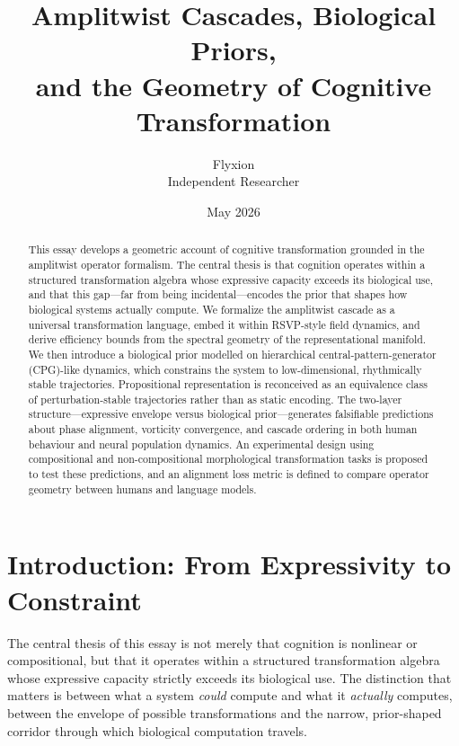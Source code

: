 \documentclass[12pt, a4paper]{article}
\title{\textbf{Amplitwist Cascades, Biological Priors,\\[0.3ex]
and the Geometry of Cognitive Transformation}}
\author{Flyxion\\[0.5ex]
\small Independent Researcher}
\date{May 2026}
\theoremstyle{remark}
\theoremstyle{definition}
\begin{document}
\maketitle

\begin{abstract}
\noindent
This essay develops a geometric account of cognitive transformation grounded in the
amplitwist operator formalism.  The central thesis is that cognition operates within a
structured transformation algebra whose expressive capacity exceeds its biological use,
and that this gap---far from being incidental---encodes the prior that shapes how biological
systems actually compute.  We formalize the amplitwist cascade as a universal transformation
language, embed it within RSVP-style field dynamics, and derive efficiency bounds from the
spectral geometry of the representational manifold.  We then introduce a biological prior
modelled on hierarchical central-pattern-generator (CPG)-like dynamics, which constrains
the system to low-dimensional, rhythmically stable trajectories.  Propositional
representation is reconceived as an equivalence class of perturbation-stable trajectories
rather than as static encoding.  The two-layer structure---expressive envelope versus
biological prior---generates falsifiable predictions about phase alignment, vorticity
convergence, and cascade ordering in both human behaviour and neural population dynamics.
An experimental design using compositional and non-compositional morphological
transformation tasks is proposed to test these predictions, and an alignment loss metric is
defined to compare operator geometry between humans and language models.
\end{abstract}

\tableofcontents
\bigskip

\section{Introduction: From Expressivity to Constraint}
\label{sec:intro}

The central thesis of this essay is not merely that cognition is nonlinear or
compositional, but that it operates within a structured transformation algebra whose
expressive capacity strictly exceeds its biological use.  The distinction that matters is
between what a system \emph{could} compute and what it \emph{actually} computes, between
the envelope of possible transformations and the narrow, prior-shaped corridor through which
biological computation travels.
\end{document}
